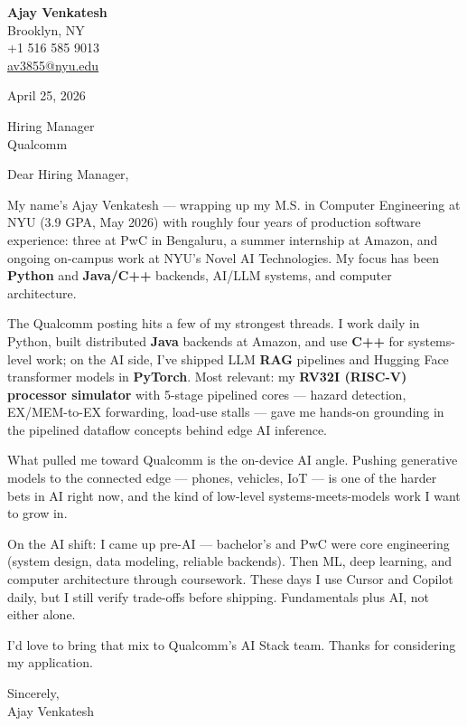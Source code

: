 \documentclass[letterpaper,11pt]{article}
\begin{document}
\begin{flushleft}
\textbf{\large Ajay Venkatesh} \\
Brooklyn, NY \\
+1 516 585 9013 \\
\href{mailto:av3855@nyu.edu}{av3855@nyu.edu}
\end{flushleft}

\vspace{10pt}

April 25, 2026

\vspace{6pt}

Hiring Manager \\
Qualcomm

\vspace{10pt}

Dear Hiring Manager,

My name's Ajay Venkatesh --- wrapping up my M.S. in Computer Engineering at NYU (3.9 GPA, May 2026) with roughly four years of production software experience: three at PwC in Bengaluru, a summer internship at Amazon, and ongoing on-campus work at NYU's Novel AI Technologies. My focus has been \textbf{Python} and \textbf{Java/C++} backends, AI/LLM systems, and computer architecture.

The Qualcomm posting hits a few of my strongest threads. I work daily in Python, built distributed \textbf{Java} backends at Amazon, and use \textbf{C++} for systems-level work; on the AI side, I've shipped LLM \textbf{RAG} pipelines and Hugging Face transformer models in \textbf{PyTorch}. Most relevant: my \textbf{RV32I (RISC-V) processor simulator} with 5-stage pipelined cores --- hazard detection, EX/MEM-to-EX forwarding, load-use stalls --- gave me hands-on grounding in the pipelined dataflow concepts behind edge AI inference.

What pulled me toward Qualcomm is the on-device AI angle. Pushing generative models to the connected edge --- phones, vehicles, IoT --- is one of the harder bets in AI right now, and the kind of low-level systems-meets-models work I want to grow in.

On the AI shift: I came up pre-AI --- bachelor's and PwC were core engineering (system design, data modeling, reliable backends). Then ML, deep learning, and computer architecture through coursework. These days I use Cursor and Copilot daily, but I still verify trade-offs before shipping. Fundamentals plus AI, not either alone.

I'd love to bring that mix to Qualcomm's AI Stack team. Thanks for considering my application.

\vspace{12pt}

Sincerely, \\
Ajay Venkatesh
\end{document}
